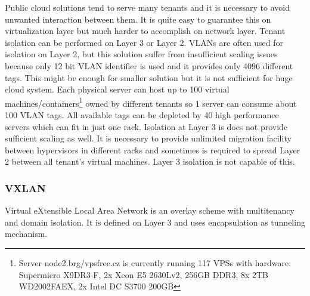 Public cloud solutions tend to serve many tenants and it is necessary to avoid unwanted interaction between them. It is quite easy to guarantee this on virtualization layer but much harder to accomplish on network layer. Tenant isolation can be performed on Layer 3 or Layer 2. \Ac{VLAN}s are often used for isolation on Layer 2, but this solution suffer from insufficient scaling issues because only 12 bit \Ac{VLAN} identifier is used and it provides only 4096 different tags. This might be enough for smaller solution but it is not sufficient for huge cloud system. Each physical server can host up to 100 virtual machines/containers\footnote{Server node2.brg/vpsfree.cz is currently running 117 \Ac{VPS}s with hardware: Supermicro \mbox{X9DR3-F}, 2x Xeon E5 2630Lv2, 256GB DDR3, 8x 2TB WD2002FAEX, 2x Intel DC S3700 200GB} owned by different tenants so 1 server can consume about 100 \Ac{VLAN} tags. All available tags can be depleted by 40 high performance servers which can fit in just one rack. Isolation at Layer 3 is does not provide sufficient scaling as well. It is necessary to provide unlimited migration facility between hypervisors in different racks and sometimes is required to spread Layer 2 between all tenant's virtual machines. Layer 3 isolation is not capable of this.



\subsubsection{VXLAN}
Virtual eXtensible Local Area Network is an overlay scheme with multitenancy and domain isolation. It is defined on Layer 3 and uses encapsulation as tunneling mechanism.

